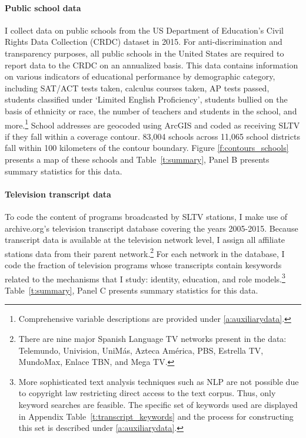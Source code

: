 \documentclass[11pt]{article}
\begin{document}
\paragraph{Public school data} I collect data on public schools from the US Department of Education's Civil Rights Data Collection (CRDC) dataset in 2015. For anti-discrimination and transparency purposes, all public schools in the United States are required to report data to the CRDC on an annualized basis. This data contains information on various indicators of educational performance by demographic category, including SAT/ACT tests taken, calculus courses taken, AP tests passed, students classified under `Limited English Proficiency', students bullied on the basis of ethnicity or race, the number of teachers and students in the school, and more.\footnote{ Comprehensive variable descriptions are provided under \ref{a:auxiliarydata}.} School addresses are geocoded using ArcGIS and coded as receiving SLTV if they fall within a coverage contour. 83,004 schools across 11,065 school districts fall within 100 kilometers of the contour boundary. Figure \ref{f:contours_schools} presents a map of these schools and Table~\ref{t:summary}, Panel B presents summary statistics for this data. 


\paragraph{Television transcript data} To code the content of programs broadcasted by SLTV stations, I make use of archive.org's television transcript database covering the years 2005-2015. Because transcript data is available at the television network level, I assign all affiliate stations data from their parent network.\footnote{ There are nine major Spanish Language TV networks present in the data: Telemundo, Univision, UniMás, Azteca América, PBS, Estrella TV, MundoMax, Enlace TBN, and Mega TV. } For each network in the database, I code the fraction of television programs whose transcripts contain kesywords related to the mechanisms that I study: identity, education, and role models.\footnote{ More sophisticated text analysis techniques such as NLP are not possible due to copyright law restricting direct access to the text corpus. Thus, only keyword searches are feasible. The specific set of keywords used are displayed in Appendix Table~\ref{t:transcript_keywords} and the process for constructing this set is described under \ref{a:auxiliarydata}.}  Table~\ref{t:summary}, Panel C presents summary statistics for this data. 
\end{document}
